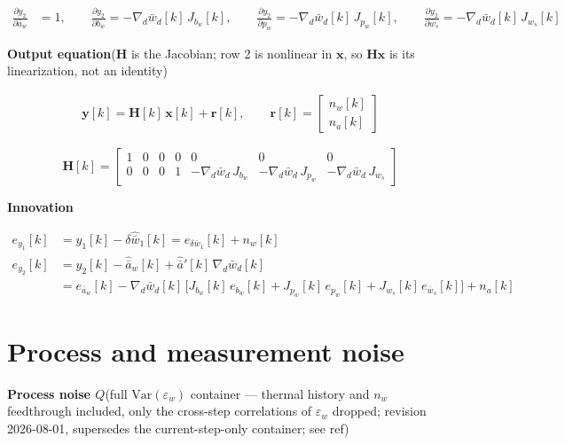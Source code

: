 \documentclass[11pt,a4paper,fontset=none]{ctexart}
\begin{document}
\begin{align*}
\frac{\partial y_2}{\partial \bar{a}_w} &= 1, \qquad
\frac{\partial y_2}{\partial b_w}
  = -\nabla_d\bar{w}_d[k]\,J_{b_w}[k], \qquad
\frac{\partial y_2}{\partial p_w}
  = -\nabla_d\bar{w}_d[k]\,J_{p_w}[k], \qquad
\frac{\partial y_2}{\partial \bar{w}_s}
  = -\nabla_d\bar{w}_d[k]\,J_{w_s}[k]
\end{align*}

\textbf{Output equation}\quad ($\mathbf{H}$ is the Jacobian; row 2 is
nonlinear in $\mathbf{x}$, so $\mathbf{H}\mathbf{x}$ is its linearization,
not an identity)

\begin{align*}
\mathbf{y}[k] = \mathbf{H}[k]\,\mathbf{x}[k] + \mathbf{r}[k],
\qquad
\mathbf{r}[k] =
\begin{bmatrix} n_w[k] \\ n_a[k] \end{bmatrix}
\end{align*}

{\small
\setlength{\arraycolsep}{4pt}
\begin{equation*}
\mathbf{H}[k] =
\begin{bmatrix}
1 & 0 & 0 & 0 & 0 & 0 & 0 \\
0 & 0 & 0 & 1 &
-\nabla_d\bar{w}_d\,J_{b_w} &
-\nabla_d\bar{w}_d\,J_{p_w} &
-\nabla_d\bar{w}_d\,J_{w_s}
\end{bmatrix}
\end{equation*}
}

\textbf{Innovation}

\begin{align*}
e_{y_1}[k] &= y_1[k] - \delta\hat{\bar{w}}_1[k]
  = e_{\delta\bar{w}_1}[k] + n_w[k] \\
e_{y_2}[k] &= y_2[k] - \hat{\bar{a}}_w[k]
  + \hat{\bar{a}}'[k]\,\nabla_d\bar{w}_d[k] \\
  &= e_{\bar{a}_w}[k]
  - \nabla_d\bar{w}_d[k]\,
    \bigl[J_{b_w}[k]\,e_{b_w}[k] + J_{p_w}[k]\,e_{p_w}[k]
    + J_{w_s}[k]\,e_{\bar{w}_s}[k]\bigr]
  + n_a[k]
\end{align*}

\section{Process and measurement noise}

\textbf{Process noise $Q$}\quad (full $\mathrm{Var}(\varepsilon_w)$
container --- thermal history and $n_w$ feedthrough included, only the
cross-step correlations of $\varepsilon_w$ dropped; revision 2026-08-01,
supersedes the current-step-only container; see ref)
\end{document}
